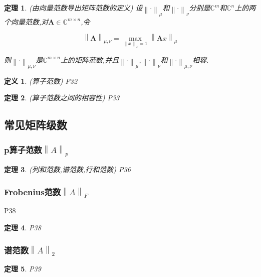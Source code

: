 \documentclass[twoside]{article}
\newtheorem{theorem}{定理}[section]
\newtheorem{definition}{定义}[section]
\newcommand{\norm}[1]{\left\lVert#1\right\rVert}
\begin{document}
    \begin{theorem}
      (由向量范数导出矩阵范数的定义) 设$\norm{\cdot}_\mu$和$\norm{\cdot}_\nu$分别是$\mathds{C}^m$和$\mathds{C}^n$上的两个向量范数,对$\mathbf{A}\in \mathds{C}^{m\times n}$,令

      \begin{equation*}
        \norm{\mathbf{A}}_{\mu, \nu} = \max_{\norm{x}_\nu =1} \norm{\mathbf{A}x}_\mu
      \end{equation*}

      则$\norm{\cdot}_{\mu, \nu}$是$\mathds{C}^{m\times n}$上的矩阵范数,并且$\norm{\cdot}_{\mu}$,$\norm{\cdot}_{\nu}$和$\norm{\cdot}_{\mu, \nu}$相容.
    \end{theorem}

    \begin{definition}
      (算子范数) P32
    \end{definition}

    \begin{theorem}
      (算子范数之间的相容性) P33
    \end{theorem}

  \subsection{常见矩阵级数}\label{sub:chang_jian_ju_zhen_ji_shu_}
    \subsubsection{p算子范数$\norm{A}_p$}\label{ssub:psuan_zi_fan_shu_}
      \begin{theorem}
        (列和范数,谱范数,行和范数) P36
      \end{theorem}

    \subsubsection{Frobenius范数$\norm{A}_F$}\label{ssub:frobeniusfan_shu_}
      P38
      \begin{theorem}
        P38
      \end{theorem}

    \subsubsection{谱范数$\norm{A}_2$}\label{ssub:pu_fan_shu_}
      \begin{theorem}
        P39
      \end{theorem}
\end{document}
